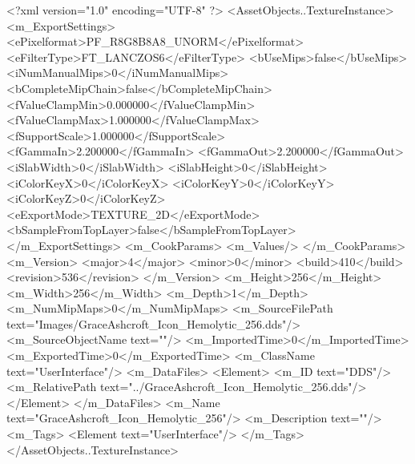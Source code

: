<?xml version="1.0" encoding="UTF-8" ?>
<AssetObjects..TextureInstance>
	<m_ExportSettings>
		<ePixelformat>PF_R8G8B8A8_UNORM</ePixelformat>
		<eFilterType>FT_LANCZOS6</eFilterType>
		<bUseMips>false</bUseMips>
		<iNumManualMips>0</iNumManualMips>
		<bCompleteMipChain>false</bCompleteMipChain>
		<fValueClampMin>0.000000</fValueClampMin>
		<fValueClampMax>1.000000</fValueClampMax>
		<fSupportScale>1.000000</fSupportScale>
		<fGammaIn>2.200000</fGammaIn>
		<fGammaOut>2.200000</fGammaOut>
		<iSlabWidth>0</iSlabWidth>
		<iSlabHeight>0</iSlabHeight>
		<iColorKeyX>0</iColorKeyX>
		<iColorKeyY>0</iColorKeyY>
		<iColorKeyZ>0</iColorKeyZ>
		<eExportMode>TEXTURE_2D</eExportMode>
		<bSampleFromTopLayer>false</bSampleFromTopLayer>
	</m_ExportSettings>
	<m_CookParams>
		<m_Values/>
	</m_CookParams>
	<m_Version>
		<major>4</major>
		<minor>0</minor>
		<build>410</build>
		<revision>536</revision>
	</m_Version>
	<m_Height>256</m_Height>
	<m_Width>256</m_Width>
	<m_Depth>1</m_Depth>
	<m_NumMipMaps>0</m_NumMipMaps>
	<m_SourceFilePath text="Images/GraceAshcroft_Icon_Hemolytic_256.dds"/>
	<m_SourceObjectName text=""/>
	<m_ImportedTime>0</m_ImportedTime>
	<m_ExportedTime>0</m_ExportedTime>
	<m_ClassName text="UserInterface"/>
	<m_DataFiles>
		<Element>
			<m_ID text="DDS"/>
			<m_RelativePath text="../GraceAshcroft_Icon_Hemolytic_256.dds"/>
		</Element>
	</m_DataFiles>
	<m_Name text="GraceAshcroft_Icon_Hemolytic_256"/>
	<m_Description text=""/>
	<m_Tags>
		<Element text="UserInterface"/>
	</m_Tags>
</AssetObjects..TextureInstance>
